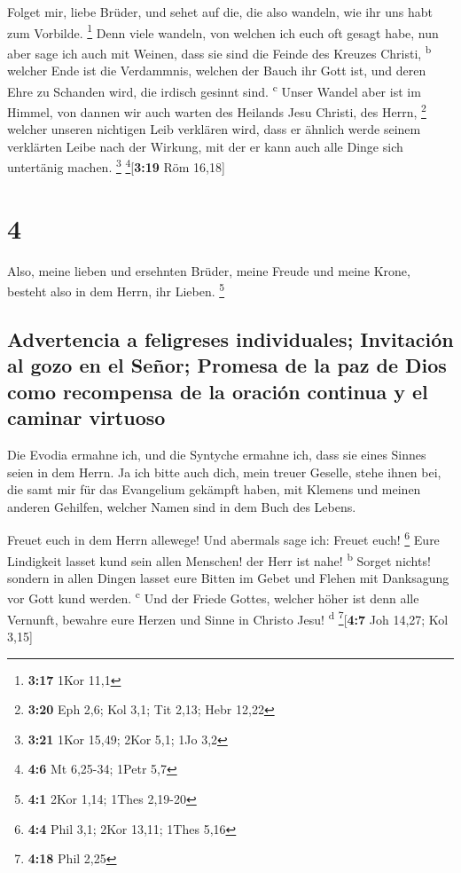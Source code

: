  Folget mir, liebe Brüder, und sehet auf die, die also
wandeln, wie ihr uns habt zum Vorbilde. \footnote{\textbf{3:17} 1Kor
  11,1}  Denn viele wandeln, von welchen ich euch oft
gesagt habe, nun aber sage ich auch mit Weinen, dass sie sind die Feinde
des Kreuzes Christi, \textsuperscript{b}  welcher Ende
ist die Verdammnis, welchen der Bauch ihr Gott ist, und deren Ehre zu
Schanden wird, die irdisch gesinnt sind. \textsuperscript{c}
 Unser Wandel aber ist im Himmel, von dannen wir auch
warten des Heilands Jesu Christi, des Herrn, \footnote{\textbf{3:20} Eph
  2,6; Kol 3,1; Tit 2,13; Hebr 12,22}  welcher unseren
nichtigen Leib verklären wird, dass er ähnlich werde seinem verklärten
Leibe nach der Wirkung, mit der er kann auch alle Dinge sich untertänig
machen. \footnote{\textbf{3:21} 1Kor 15,49; 2Kor 5,1; 1Jo 3,2}
\footnote{\textbf{4:6} Mt 6,25-34; 1Petr 5,7}{[}\textbf{3:19} Röm
16,18{]}

\hypertarget{section-3}{%
\section{4}\label{section-3}}

 Also, meine lieben und ersehnten Brüder, meine Freude und
meine Krone, besteht also in dem Herrn, ihr Lieben. \footnote{\textbf{4:1}
  2Kor 1,14; 1Thes 2,19-20}

\hypertarget{advertencia-a-feligreses-individuales-invitaciuxf3n-al-gozo-en-el-seuxf1or-promesa-de-la-paz-de-dios-como-recompensa-de-la-oraciuxf3n-continua-y-el-caminar-virtuoso}{%
\subsection{Advertencia a feligreses individuales; Invitación al gozo en
el Señor; Promesa de la paz de Dios como recompensa de la oración
continua y el caminar
virtuoso}\label{advertencia-a-feligreses-individuales-invitaciuxf3n-al-gozo-en-el-seuxf1or-promesa-de-la-paz-de-dios-como-recompensa-de-la-oraciuxf3n-continua-y-el-caminar-virtuoso}}

 Die Evodia ermahne ich, und die Syntyche ermahne ich,
dass sie eines Sinnes seien in dem Herrn.  Ja ich bitte
auch dich, mein treuer Geselle, stehe ihnen bei, die samt mir für das
Evangelium gekämpft haben, mit Klemens und meinen anderen Gehilfen,
welcher Namen sind in dem Buch des Lebens.

 Freuet euch in dem Herrn allewege! Und abermals sage ich:
Freuet euch! \footnote{\textbf{4:4} Phil 3,1; 2Kor 13,11; 1Thes 5,16}
 Eure Lindigkeit lasset kund sein allen Menschen! der Herr
ist nahe! \textsuperscript{b}  Sorget nichts! sondern in
allen Dingen lasset eure Bitten im Gebet und Flehen mit Danksagung vor
Gott kund werden. \textsuperscript{c}  Und der Friede
Gottes, welcher höher ist denn alle Vernunft, bewahre eure Herzen und
Sinne in Christo Jesu! \textsuperscript{d} \footnote{\textbf{4:18} Phil
  2,25}{[}\textbf{4:7} Joh 14,27; Kol 3,15{]}


